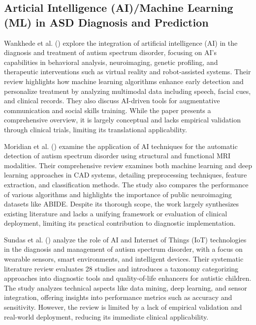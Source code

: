 \documentclass[pdflatex,sn-basic]{sn-jnl}%
\theoremstyle{thmstyleone}%
\theoremstyle{thmstyletwo}%
\theoremstyle{thmstylethree}%
\begin{document}
  \subsection{Articial Intelligence (AI)/Machine Learning (ML) in ASD Diagnosis and Prediction}

  Wankhede et al. (\cite{wankhede_leveraging_2024})  explore the integration of artificial intelligence (AI) in the diagnosis and
  treatment of autism spectrum disorder, focusing on AI's capabilities in behavioral analysis, neuroimaging, genetic profiling,
  and therapeutic interventions such as virtual reality and robot-assisted systems. Their review highlights how machine learning
  algorithms enhance early detection and personalize treatment by analyzing multimodal data including speech, facial cues, and
  clinical records. They also discuss AI-driven tools for augmentative communication and social skills training. While the paper
  presents a comprehensive overview, it is largely conceptual and lacks empirical validation through clinical trials, limiting
  its translational applicability.

  Moridian et al. (\cite{moridian_automatic_2022}) examine the application of AI techniques for the automatic detection of autism
  spectrum disorder using structural and functional MRI modalities. Their comprehensive review examines both machine learning and
  deep learning approaches in CAD systems, detailing preprocessing techniques, feature extraction, and classification methods.
  The study also compares the performance of various algorithms and highlights the importance of public neuroimaging datasets
  like ABIDE. Despite its thorough scope, the work largely synthesizes existing literature and lacks a unifying framework or
  evaluation of clinical deployment, limiting its practical contribution to diagnostic implementation.

  Sundas et al. (\cite{sundas_evaluation_2023}) analyze the role of AI and Internet of Things (IoT) technologies in the diagnosis
  and management of autism spectrum disorder, with a focus on wearable sensors, smart environments, and intelligent devices.
  Their systematic literature review evaluates 28 studies and introduces a taxonomy categorizing approaches into diagnostic tools
  and quality-of-life enhancers for autistic children. The study analyzes technical aspects like data mining, deep learning, and
  sensor integration, offering insights into performance metrics such as accuracy and sensitivity. However, the review is limited
  by a lack of empirical validation and real-world deployment, reducing its immediate clinical applicability.
\end{document}

